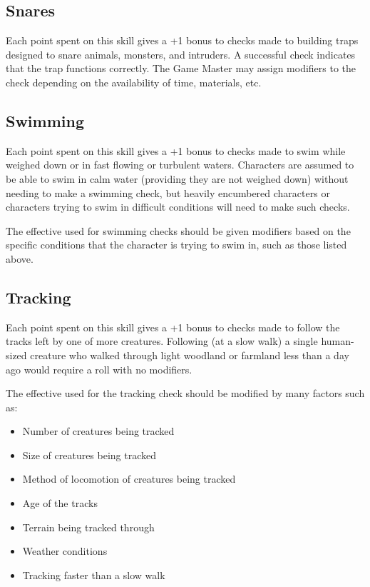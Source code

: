 \begin{multicols*}{2}
\subsection{Snares}\label{skill:Snares}
Each point spent on this skill gives a +1 bonus to  checks made to building traps designed to snare animals, monsters, and intruders. A successful check indicates that the trap functions correctly. The Game Master may assign modifiers to the check depending on the availability of time, materials, etc.

\subsection{Swimming}\label{skill:Swimming}
Each point spent on this skill gives a +1 bonus to  checks made to swim while weighed down or in fast flowing or turbulent waters. Characters are assumed to be able to swim in calm water (providing they are not weighed down) without needing to make a swimming check, but heavily encumbered characters or characters trying to swim in difficult conditions will need to make such checks.

The effective  used for swimming checks should be given modifiers based on the specific conditions that the character is trying to swim in, such as those listed above.

\subsection{Tracking}\label{skill:Tracking}
Each point spent on this skill gives a +1 bonus to  checks made to follow the tracks left by one of more creatures. Following (at a slow walk) a single human-sized creature who walked through light woodland or farmland less than a day ago would require a roll with no modifiers.

The effective  used for the tracking check should be modified by many factors such as:

\begin{itemize}
	\item{Number of creatures being tracked}
	\item{Size of creatures being tracked}
	\item{Method of locomotion of creatures being tracked}
	\item{Age of the tracks}
	\item{Terrain being tracked through}
	\item{Weather conditions}
	\item{Tracking faster than a slow walk}
\end{itemize}
\end{multicols*}

